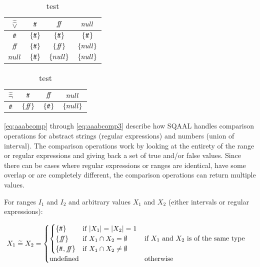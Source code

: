 \begin{table}[H]
    \centering
    \caption{test}
    \begin{tabular}{c|ccc}
        $\widetilde{\widetilde{\lor}}$ & $t\!t$ & $f\!\!f$ & $null$ \\
        \hline
        $t\!t$ & $\{t\!t\}$ & $\{t\!t\}$ & $\{t\!t\}$ \\
        $f\!\!f$ & $\{t\!t\}$ & $\{f\!\!f\}$ & $\{null\}$ \\
        $null$ & $\{t\!t\}$ & $\{null\}$ & $\{null\}$ \\
    \end{tabular}
    \label{tab:aaablor}
\end{table}

\begin{table}[H]
    \centering
    \caption{test}
    \begin{tabular}{c|ccc}
        $\widetilde{\widetilde{\neg}}$ & $t\!t$ & $f\!\!f$ & $null$ \\
        \hline
        $t\!t$ & $\{f\!\!f\}$ & $\{t\!t\}$ & $\{null\}$ \\
    \end{tabular}
    \label{tab:aaabneg}
\end{table}

\autoref{eq:aaabcomp} through \ref{eq:aaabcomp3} describe how SQAAL handles comparison operations for abstract strings (regular expressions) and numbers (union of interval).
The comparison operations work by looking at the entirety of the range or regular expressions and giving back a set of true and/or false values.
Since there can be cases where regular expressions or ranges are identical, have some overlap or are completely different, the comparison operations can return multiple values.


For ranges $I_1$ and $I_2$ and arbitrary values $X_1$ and $X_2$ (either intervals or regular expressions):

\begin{align} \label{eq:aaabcomp}
    X_1 \;\aab{=}\; X_2 &= \begin{cases}
        \begin{cases}
        \{\true\} & \text{if } |X_1| = |X_2| = 1 \\
        \{\false\} & \text{if } X_1 \cap X_2 = \emptyset \\
        \{\true, \false\} & \text{if } X_1 \cap X_2 \neq \emptyset
        \end{cases} & \text{if $X_1$ and $X_2$ is of the same type} \\
        \text{undefined} & \text{otherwise}
    \end{cases}
\end{align}

